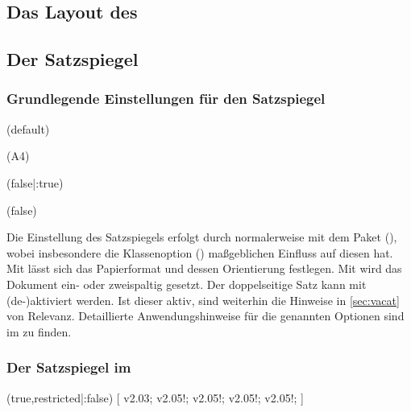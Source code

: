 \begin{DeclareEntity*}{}
\begin{DeclareEntity*}{}
\begin{DeclareEntity*}{}
\section{%
  Das Layout des \CDs%
}
\subsection{%
  Der Satzspiegel%
}
\subsubsection{Grundlegende Einstellungen für den Satzspiegel}

\begin{Entity}{}
\begin{Declaration}
  {}
  (default)
\begin{Declaration}
  {}
  (A4)
\begin{Declaration}
  {}
  (false|:true)
\begin{Declaration}
  {}
  (false)

Die Einstellung des Satzspiegels erfolgt durch \KOMAScript normalerweise mit 
dem Paket (), wobei insbesondere die 
Klassenoption () maßgeblichen Einfluss auf 
diesen hat. Mit  lässt sich das Papierformat und dessen 
Orientierung festlegen. Mit  wird das 
Dokument ein- oder zweispaltig gesetzt. Der doppelseitige Satz kann mit 
 (de-)aktiviert werden. Ist dieser aktiv, sind weiterhin 
die Hinweise in \autoref{sec:vacat} von Relevanz. Detaillierte 
Anwendungshinweise für die genannten Optionen sind im \scrguide zu finden.
\end{Declaration}
\end{Declaration}
\end{Declaration}
\end{Declaration}
\end{Entity}



\subsubsection{Der Satzspiegel im \TUDCD}

\begin{Declaration}
  {}
  (true,restricted|:false)
  [
    v2.03;
    v2.05!;%
    v2.05!;%
    v2.05!;%
    v2.05!;%
  ]


\end{Declaration}
\end{DeclareEntity*}
\end{DeclareEntity*}
\end{DeclareEntity*}
